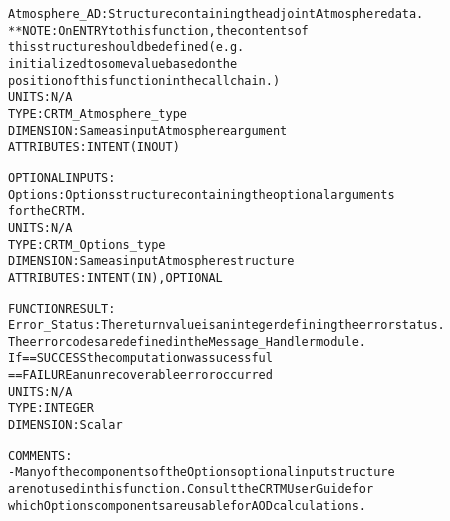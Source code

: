 \begin{alltt}
        Atmosphere_AD:  Structure containing the adjoint Atmosphere data.
                        **NOTE: On ENTRY to this function, the contents of
                                this structure should be defined (e.g.
                                initialized to some value based on the
                                position of this function in the call chain.)
                        UNITS:      N/A
                        TYPE:       CRTM_Atmosphere_type
                        DIMENSION:  Same as input Atmosphere argument
                        ATTRIBUTES: INTENT(IN OUT)
 
  OPTIONAL INPUTS:
        Options:        Options structure containing the optional arguments
                        for the CRTM.
                        UNITS:      N/A
                        TYPE:       CRTM_Options_type
                        DIMENSION:  Same as input Atmosphere structure
                        ATTRIBUTES: INTENT(IN), OPTIONAL
 
  FUNCTION RESULT:
        Error_Status:   The return value is an integer defining the error status.
                        The error codes are defined in the Message_Handler module.
                        If == SUCCESS the computation was sucessful
                           == FAILURE an unrecoverable error occurred
                        UNITS:      N/A
                        TYPE:       INTEGER
                        DIMENSION:  Scalar
 
  COMMENTS:
        - Many of the components of the Options optional input structure
          are not used in this function. Consult the CRTM User Guide for
          which Options components are usable for AOD calculations.
 
  \end{alltt}
